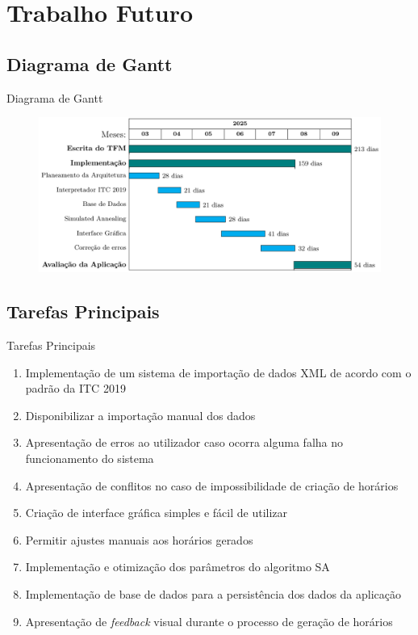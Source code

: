 \documentclass[11]{beamer}
\begin{document}
    \section{Trabalho Futuro}

    \subsection{Diagrama de Gantt}

    \begin{frame}{Diagrama de Gantt}
        \justifying
        \begin{figure}
            \includegraphics[width=\linewidth]{img/Diagrama-Gantt.png}
        \end{figure}
    \end{frame}

    \subsection{Tarefas Principais}

    \begin{frame}{Tarefas Principais}
        \justifying
        \begin{enumerate}
            \item Implementação de um sistema de importação de dados XML de acordo com o padrão da ITC 2019
            \item Disponibilizar a importação manual dos dados
            \item Apresentação de erros ao utilizador caso ocorra alguma falha no funcionamento do sistema
            \item Apresentação de conflitos no caso de impossibilidade de criação de horários
            \item Criação de interface gráfica simples e fácil de utilizar
            \item Permitir ajustes manuais aos horários gerados
            \item Implementação e otimização dos parâmetros do algoritmo SA
            \item Implementação de base de dados para a persistência dos dados da aplicação
            \item Apresentação de \textit{feedback} visual durante o processo de geração de horários
        \end{enumerate}
    \end{frame}
\end{document}
